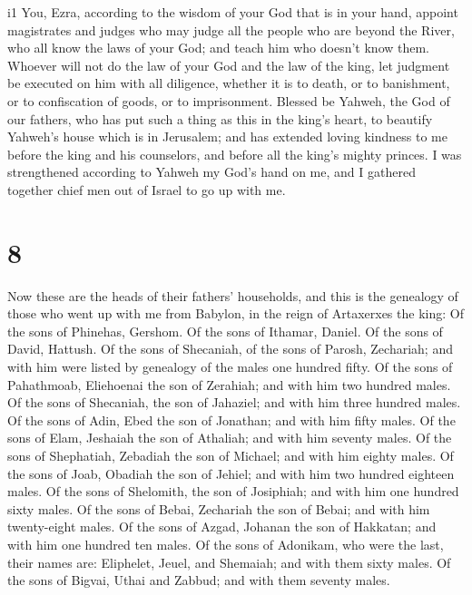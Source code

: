 i1 You, Ezra, according to the wisdom of your God that is
in your hand, appoint magistrates and judges who may judge all the
people who are beyond the River, who all know the laws of your God; and
teach him who doesn't know them.  Whoever will not do the
law of your God and the law of the king, let judgment be executed on him
with all diligence, whether it is to death, or to banishment, or to
confiscation of goods, or to imprisonment.  Blessed be
Yahweh, the God of our fathers, who has put such a thing as this in the
king's heart, to beautify Yahweh's house which is in Jerusalem;
 and has extended loving kindness to me before the king
and his counselors, and before all the king's mighty princes. I was
strengthened according to Yahweh my God's hand on me, and I gathered
together chief men out of Israel to go up with me.

\hypertarget{section-7}{%
\section{8}\label{section-7}}

 Now these are the heads of their fathers' households, and
this is the genealogy of those who went up with me from Babylon, in the
reign of Artaxerxes the king:  Of the sons of Phinehas,
Gershom. Of the sons of Ithamar, Daniel. Of the sons of David, Hattush.
 Of the sons of Shecaniah, of the sons of Parosh,
Zechariah; and with him were listed by genealogy of the males one
hundred fifty.  Of the sons of Pahathmoab, Eliehoenai the
son of Zerahiah; and with him two hundred males.  Of the
sons of Shecaniah, the son of Jahaziel; and with him three hundred
males.  Of the sons of Adin, Ebed the son of Jonathan; and
with him fifty males.  Of the sons of Elam, Jeshaiah the
son of Athaliah; and with him seventy males.  Of the sons
of Shephatiah, Zebadiah the son of Michael; and with him eighty males.
 Of the sons of Joab, Obadiah the son of Jehiel; and with
him two hundred eighteen males.  Of the sons of
Shelomith, the son of Josiphiah; and with him one hundred sixty males.
 Of the sons of Bebai, Zechariah the son of Bebai; and
with him twenty-eight males.  Of the sons of Azgad,
Johanan the son of Hakkatan; and with him one hundred ten males.
 Of the sons of Adonikam, who were the last, their names
are: Eliphelet, Jeuel, and Shemaiah; and with them sixty males.
 Of the sons of Bigvai, Uthai and Zabbud; and with them
seventy males.

